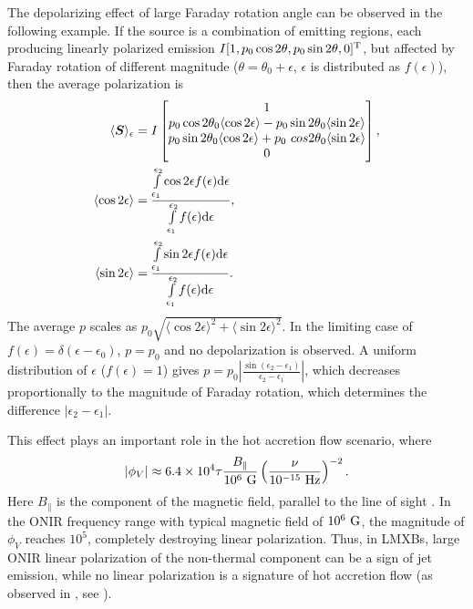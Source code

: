The depolarizing effect of large Faraday rotation angle can be observed in the following example.
If the source is a combination of emitting regions, each producing linearly polarized emission $I[1, p_0\cos2\theta, p_0\sin2\theta, 0]^{\mathrm{T}}$, but affected by Faraday rotation of different magnitude ($\theta = \theta_0 + \epsilon$, $\epsilon$ is distributed as $f(\epsilon)$), then the average polarization is 
\begin{align}
    \langle\vctr{S}\rangle_\epsilon & = 
    I\begin{bmatrix}
     1 \\
     p_0 \cos2\theta_0\langle\cos2\epsilon\rangle - p_0 \sin2\theta_0\langle\sin2\epsilon\rangle \\   
     p_0 \sin2\theta_0\langle\cos2\epsilon\rangle + p_0\ cos2\theta_0\langle\sin2\epsilon\rangle \\
     0 
    \end{bmatrix}, \\
    \langle\cos2\epsilon\rangle &= \frac{\int\limits_{\epsilon_1}^{\epsilon_2} \cos2\epsilon f(\epsilon) \dd \epsilon}{ \int\limits_{\epsilon_1}^{\epsilon_2}  f(\epsilon) \dd \epsilon}, \\
    \langle\sin2\epsilon\rangle &= \frac{\int\limits_{\epsilon_1}^{\epsilon_2} \sin2\epsilon f(\epsilon) \dd \epsilon}{ \int\limits_{\epsilon_1}^{\epsilon_2}  f(\epsilon) \dd \epsilon}.
\end{align}
The average $p$ scales as $p_0 \sqrt{\langle\cos2\epsilon\rangle^2 + \langle\sin2\epsilon\rangle^2}$.
In the limiting case of $f(\epsilon) = \delta(\epsilon - \epsilon_0)$, $p = p_0$ and no depolarization is observed.
A uniform distribution of $\epsilon$ ($f(\epsilon) = 1$) gives $p = p_0\left|\frac{\sin (\epsilon_2 - \epsilon_1)}{\epsilon_2 - \epsilon_1}\right|$, which decreases proportionally to the magnitude of Faraday rotation, which determines the difference $|\epsilon_2 - \epsilon_1|$.

This effect plays an important role in the hot accretion flow scenario, where
\begin{equation}
|\phi_V| \approx 6.4 \times 10^4 \tau \frac{B_\parallel}{10^6~\mathrm{G}} \left(\frac{\nu}{10^{-15}~\mathrm{Hz}}\right)^{-2}.
\end{equation}
Here $B_\parallel$ is the component of the magnetic field, parallel to the line of sight \citep[see discussions in ][]{Veledina2013,Poutanen2014a}.
In the \gls{ONIR} frequency range with typical magnetic field of $10^6~\mathrm{G}$, the magnitude of $\phi_V$ reaches $10^5$, completely destroying linear polarization.
Thus, in \glspl{LMXB}, large \gls{ONIR} linear polarization of the non-thermal component can be a sign of jet emission, while no linear polarization is a signature of hot accretion flow (as observed in \MAXI, see \paperIII).
